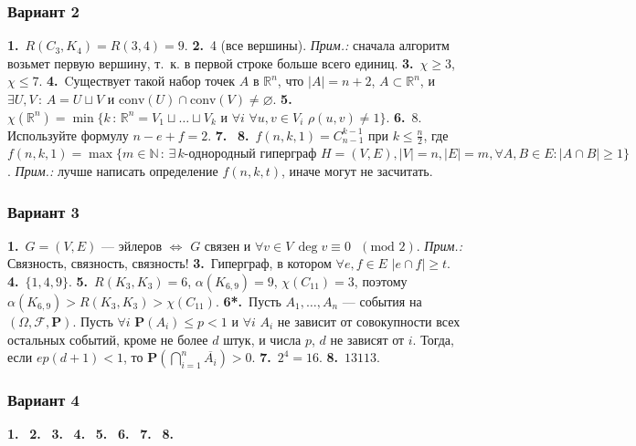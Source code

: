 \documentclass[oneside]{book}
\begin{document}
\subsubsection{Вариант 2}

\textbf{1.}~$R(C_3, K_4) = R(3, 4) = 9$.
\textbf{2.}~4 (все вершины). \textit{Прим.:} сначала алгоритм возьмет первую вершину, т.~к. в первой строке больше всего единиц.
\textbf{3.}~$\chi \geqslant 3$, $\chi \leqslant 7$.
\textbf{4.}~Cуществует такой набор точек $A$ в $\mathbb{R}^n$, что $|A|=n+2$, $A \subset \mathbb{R}^n$, и $\exists U, V\, \colon\,A = U \sqcup V$  и $\text{conv}(U) \cap \text{conv}(V) \neq \varnothing$.
\textbf{5.}~$\chi(\mathbb{R}^n) = \min\{k\,\colon\,\mathbb{R}^n=V_1\sqcup\ldots\sqcup V_k \text{ и } \forall i \,\, \forall u, v \in V_i \,\, \rho(u, v) \neq 1 \}$.
\textbf{6.}~8. Используйте формулу $n - e + f = 2$.
\textbf{7.}~
\textbf{8.}~$f(n, k, 1) = C_{n-1}^{k-1}$ при $k \leqslant \frac{n}{2}$, где $f(n, k, 1) = \max\{m \in \mathbb{N}\,\colon\,\exists\,k\text{-однородный гиперграф } H = (V, E), |V| = n, |E| = m, \forall A, B \in E \colon |A \cap B| \geqslant 1 \}$. \textit{Прим.:} лучше написать определение $f(n, k, t)$, иначе могут не засчитать.

\subsubsection{Вариант 3}

\textbf{1.}~$G = (V, E)$ --- эйлеров $\Leftrightarrow$ $G$ связен и $\forall v \in V\, \deg v \equiv 0 \,\,\,\,(\text{mod } 2)$. \textit{Прим.:} Связность, связность, связность!
\textbf{3.}~Гиперграф, в котором $\forall e, f \in E\,\,|e \cap f| \geqslant t$.
\textbf{4.}~$\{1, 4, 9\}$.
\textbf{5.}~$R(K_3, K_3) = 6$, $\alpha(K_{6, 9}) = 9$, $\chi(C_{11}) = 3$, поэтому $\alpha(K_{6, 9}) > R(K_3, K_3) > \chi(C_{11})$.
\textbf{6*.}~Пусть $A_1, \ldots, A_n$ --- события на $(\Omega, \mathscr{F}, \mathbf{P})$. Пусть $\forall i\,\, \mathbf{P}(A_i) \leqslant p < 1$ и $\forall i \,\,A_i$ не зависит от совокупности всех остальных событий, кроме не более $d$ штук, и числа $p$, $d$ не зависят от $i$. Тогда, если $ep(d+1)<1$, то $\displaystyle \mathbf{P}\left( \bigcap_{i=1}^{n} \overline{A_i}\right) > 0$.
\textbf{7.}~$2^4 = 16$.
\textbf{8.}~$1 3 1 1 3$.

\subsubsection{Вариант 4}

\textbf{1.}~
\textbf{2.}~
\textbf{3.}~
\textbf{4.}~
\textbf{5.}~
\textbf{6.}~
\textbf{7.}~
\textbf{8.}~
\end{document}
